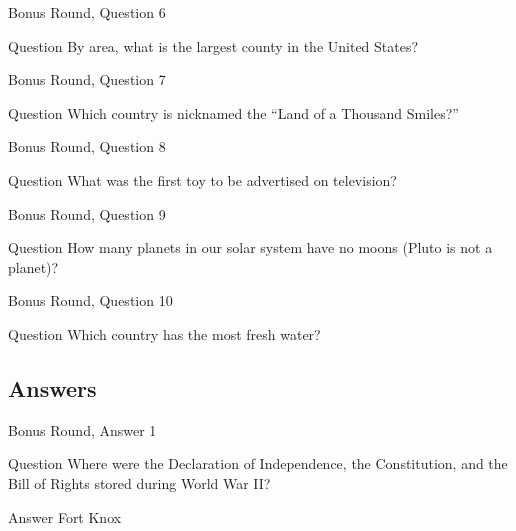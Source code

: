\documentclass[11pt]{beamer}
\begin{document}
\begin{frame}[t]{Bonus Round, Question 6}
  \vspace{2em}
  \begin{block}{Question}
    By area, what is the largest county in the United States\@?
  \end{block}
\end{frame}


\begin{frame}[t]{Bonus Round, Question 7}
  \vspace{2em}
  \begin{block}{Question}
    Which country is nicknamed the ``Land of a Thousand Smiles?''
  \end{block}
\end{frame}


\begin{frame}[t]{Bonus Round, Question 8}
  \vspace{2em}
  \begin{block}{Question}
    What was the first toy to be advertised on television\@?
  \end{block}
\end{frame}


\begin{frame}[t]{Bonus Round, Question 9}
  \vspace{2em}
  \begin{block}{Question}
    How many planets in our solar system have no moons (Pluto is not a planet)\@?
  \end{block}
\end{frame}


\begin{frame}[t]{Bonus Round, Question 10}
  \vspace{2em}
  \begin{block}{Question}
    Which country has the most fresh water\@?
  \end{block}
\end{frame}

\subsection{Answers}

\begin{frame}[t]{Bonus Round, Answer 1}
  \vspace{2em}
  \begin{block}{Question}
    Where were the Declaration of Independence, the Constitution, and the Bill of Rights stored during World War II\@?
  \end{block}
  \pause{}
  \begin{block}{Answer}
    Fort Knox
  \end{block}
\end{frame}
\end{document}
